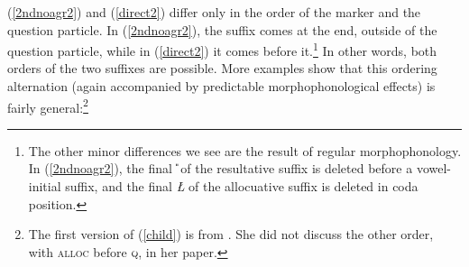 \documentclass[output=paper, modfonts, nonflat]{langsci/langscibook}
\begin{document}
\ea
 \z
\z
%
(\ref{2ndnoagr2}) and (\ref{direct2}) differ only in the order of the
\allagr{} marker and the question particle.  In (\ref{2ndnoagr2}), the
\allagr{} suffix comes at the end, outside of the question particle,
while in (\ref{direct2}) it comes before it.\footnote{The other minor
  differences we see are the result of regular morphophonology. In
  (\ref{2ndnoagr2}), the final \textit{\U} of the resultative suffix
  is deleted before a vowel-initial suffix, and the final \textit{\L}
  of the allocuative suffix is deleted in coda position.} In other
words, both orders of the two suffixes are possible. More examples
show that this ordering alternation (again accompanied by predictable
morphophonological effects) is fairly general:\footnote{The first
  version of (\ref{child}) is from \citet{amrit:1991}. She did not
  discuss the other order, with \textsc{alloc}{} before \textsc{q}, in her
  paper.}
\end{document}

